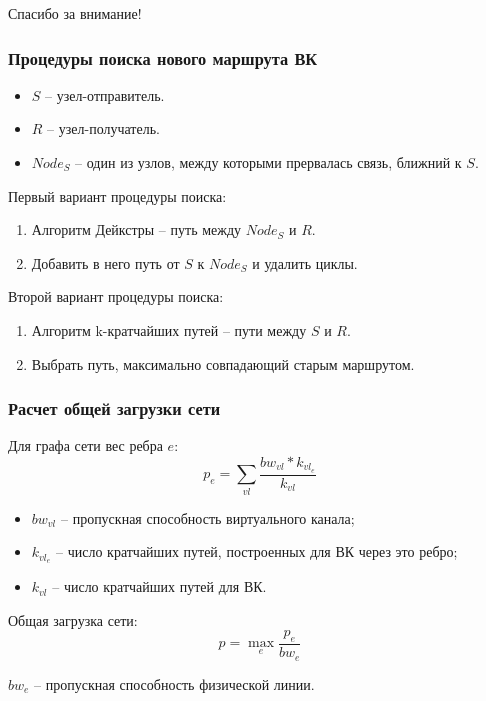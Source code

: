 \documentclass[14pt, handout]{beamer}
\begin{document}
\begin{frame}[plain]

\begin{center}
	\LARGE
	Спасибо за внимание!
\end{center}

\end{frame}



\begin{frame}
\frametitle{Процедуры поиска нового маршрута ВК}
\begin{itemize}
	\item $S$ -- узел-отправитель.
	\item $R$ -- узел-получатель.
	\item $Node_{S}$ – один из узлов, между которыми прервалась связь, ближний к $S$.
\end{itemize}

Первый вариант процедуры поиска:
\begin{enumerate}
	\item Алгоритм Дейкстры -- путь между $Node_{S}$ и $R$.
	\item Добавить в него путь от $S$ к $Node_{S}$ и удалить циклы.
\end{enumerate}

Второй вариант процедуры поиска:
\begin{enumerate}
	\item Алгоритм k-кратчайших путей -- пути между $S$ и $R$.
	\item Выбрать путь, максимально совпадающий старым маршрутом.
\end{enumerate}

\end{frame}


\begin{frame}
\frametitle{Расчет общей загрузки сети}
Для графа сети вес ребра $e$:
$$p_{e} = \sum_{vl}\frac{bw_{vl} \ast k_{vl_e}}{k_{vl}}$$
\begin{itemize}
	\item $bw_{vl}$ -- пропускная способность виртуального канала;
	\item $k_{vl_e}$ -- число кратчайших путей, построенных для ВК через это ребро;
	\item $k_{vl}$ -- число кратчайших путей для  ВК.
\end{itemize}

Общая загрузка сети:
$$p = \max_{e}\frac{p_{e}}{bw_{e}}$$

$bw_{e}$ -- пропускная способность физической линии.

\end{frame}
\end{document}
